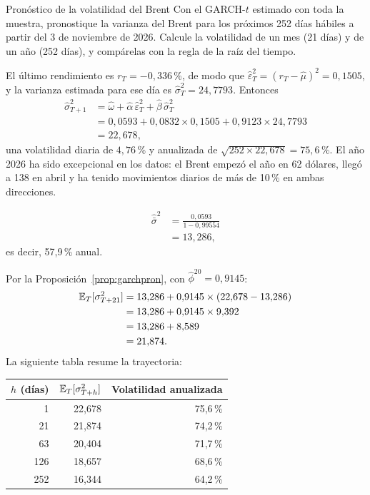 \begin{ejresuelto}{Pronóstico de la volatilidad del Brent}\label{ej:garchpron}
\enunciado Con el GARCH-$t$ estimado con toda la muestra, pronostique la varianza del Brent para los próximos
252 días hábiles a partir del 3 de noviembre de 2026. Calcule la volatilidad de un mes (21 días) y de un año
(252 días), y compárelas con la regla de la raíz del tiempo.

\solucion
{} El último rendimiento es $r_T=-0{,}336$\,\%, de modo que
$\hat\varepsilon_T^2=(r_T-\hat\mu)^2=0{,}1505$, y la varianza estimada para ese día es $\hat\sigma_T^2=24{,}7793$.
Entonces
\begin{align*}
  \hat\sigma_{T+1}^2 &= \hat\omega+\hat\alpha\,\hat\varepsilon_T^2+\hat\beta\,\hat\sigma_T^2\\
                     &= 0{,}0593+0{,}0832\times0{,}1505+0{,}9123\times24{,}7793\\
                     &= 22{,}678,
\end{align*}
una volatilidad diaria de $4{,}76$\,\% y anualizada de $\sqrt{252\times22{,}678}=75{,}6$\,\%. El año 2026 ha
sido excepcional en los datos: el Brent empezó el año en 62 dólares, llegó a 138 en abril y ha tenido
movimientos diarios de más de 10\,\% en ambas direcciones.

\begin{align*}
  \hat{\bar\sigma}^2 &= \frac{0{,}0593}{1-0{,}99554}\\
                     &= 13{,}286,
\end{align*}
es decir, 57,9\,\% anual.

 Por la Proposición~\ref{prop:garchpron}, con $\hat\phi^{20}=0{,}9145$:
\begin{align*}
  \mathbb{E}_T[\sigma_{T+21}^2] &= 13{,}286+0{,}9145\times(22{,}678-13{,}286)\\
                        &= 13{,}286+0{,}9145\times9{,}392\\
                        &= 13{,}286+8{,}589\\
                        &= 21{,}874 .
\end{align*}
La siguiente tabla resume la trayectoria:
\begin{center}\small
\begin{tabular}{@{}rrr@{}}
\toprule
$h$ (días) & $\mathbb{E}_T[\sigma^2_{T+h}]$ & Volatilidad anualizada \\
\midrule
1   & 22,678 & 75,6\,\% \\
21  & 21,874 & 74,2\,\% \\
63  & 20,404 & 71,7\,\% \\
126 & 18,657 & 68,6\,\% \\
252 & 16,344 & 64,2\,\% \\
\bottomrule
\end{tabular}
\end{center}


\end{ejresuelto}
